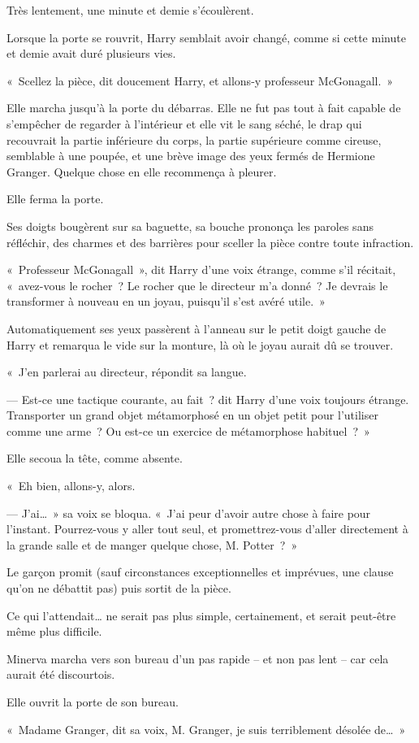 Très lentement, une minute et demie s'écoulèrent.

\later

Lorsque la porte se rouvrit, Harry semblait avoir changé, comme si cette minute et demie avait duré plusieurs vies.

«~Scellez la pièce, dit doucement Harry, et allons-y professeur McGonagall.~»

Elle marcha jusqu'à la porte du débarras. Elle ne fut pas tout à fait capable de s'empêcher de regarder à l'intérieur et elle vit le sang séché, le drap qui recouvrait la partie inférieure du corps, la partie supérieure comme cireuse, semblable à une poupée, et une brève image des yeux fermés de Hermione Granger. Quelque chose en elle recommença à pleurer.

Elle ferma la porte.

Ses doigts bougèrent sur sa baguette, sa bouche prononça les paroles sans réfléchir, des charmes et des barrières pour sceller la pièce contre toute infraction.

«~Professeur McGonagall~», dit Harry d'une voix étrange, comme s'il récitait, «~avez-vous le rocher~? Le rocher que le directeur m'a donné~? Je devrais le transformer à nouveau en un joyau, puisqu'il s'est avéré utile.~»

Automatiquement ses yeux passèrent à l'anneau sur le petit doigt gauche de Harry et remarqua le vide sur la monture, là où le joyau aurait dû se trouver.

«~J'en parlerai au directeur, répondit sa langue.

--- Est-ce une tactique courante, au fait~? dit Harry d'une voix toujours étrange. Transporter un grand objet métamorphosé en un objet petit pour l'utiliser comme une arme~? Ou est-ce un exercice de métamorphose habituel~?~»

Elle secoua la tête, comme absente.

«~Eh bien, allons-y, alors.

--- J'ai…~» sa voix se bloqua. «~J'ai peur d'avoir autre chose à faire pour l'instant. Pourrez-vous y aller tout seul, et promettrez-vous d'aller directement à la grande salle et de manger quelque chose, M. Potter~?~»

Le garçon promit (sauf circonstances exceptionnelles et imprévues, une clause qu'on ne débattit pas) puis sortit de la pièce.

Ce qui l'attendait… ne serait pas plus simple, certainement, et serait peut-être même plus difficile.

\later

Minerva marcha vers son bureau d'un pas rapide -- et non pas lent -- car cela aurait été discourtois.

Elle ouvrit la porte de son bureau.

«~Madame Granger, dit sa voix, M. Granger, je suis terriblement désolée de…~»
